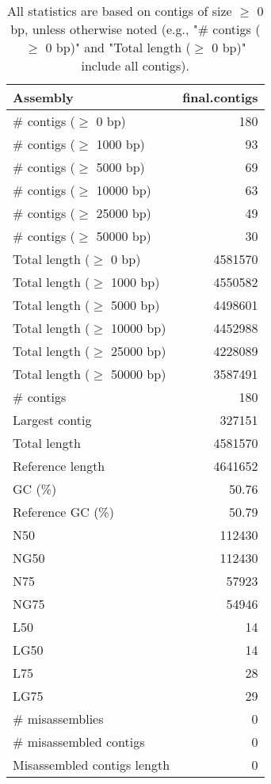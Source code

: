 \documentclass[12pt,a4paper]{article}
\begin{document}
\begin{table}[ht]
\begin{center}
\caption{All statistics are based on contigs of size $\geq$ 0 bp, unless otherwise noted (e.g., "\# contigs ($\geq$ 0 bp)" and "Total length ($\geq$ 0 bp)" include all contigs).}
\begin{tabular}{|l*{1}{|r}|}
\hline
Assembly & final.contigs \\ \hline
\# contigs ($\geq$ 0 bp) & 180 \\ \hline
\# contigs ($\geq$ 1000 bp) & 93 \\ \hline
\# contigs ($\geq$ 5000 bp) & 69 \\ \hline
\# contigs ($\geq$ 10000 bp) & 63 \\ \hline
\# contigs ($\geq$ 25000 bp) & 49 \\ \hline
\# contigs ($\geq$ 50000 bp) & 30 \\ \hline
Total length ($\geq$ 0 bp) & 4581570 \\ \hline
Total length ($\geq$ 1000 bp) & 4550582 \\ \hline
Total length ($\geq$ 5000 bp) & 4498601 \\ \hline
Total length ($\geq$ 10000 bp) & 4452988 \\ \hline
Total length ($\geq$ 25000 bp) & 4228089 \\ \hline
Total length ($\geq$ 50000 bp) & 3587491 \\ \hline
\# contigs & 180 \\ \hline
Largest contig & 327151 \\ \hline
Total length & 4581570 \\ \hline
Reference length & 4641652 \\ \hline
GC (\%) & 50.76 \\ \hline
Reference GC (\%) & 50.79 \\ \hline
N50 & 112430 \\ \hline
NG50 & 112430 \\ \hline
N75 & 57923 \\ \hline
NG75 & 54946 \\ \hline
L50 & 14 \\ \hline
LG50 & 14 \\ \hline
L75 & 28 \\ \hline
LG75 & 29 \\ \hline
\# misassemblies & 0 \\ \hline
\# misassembled contigs & 0 \\ \hline
Misassembled contigs length & 0 \\ \hline

\end{tabular}
\end{center}
\end{table}
\end{document}
